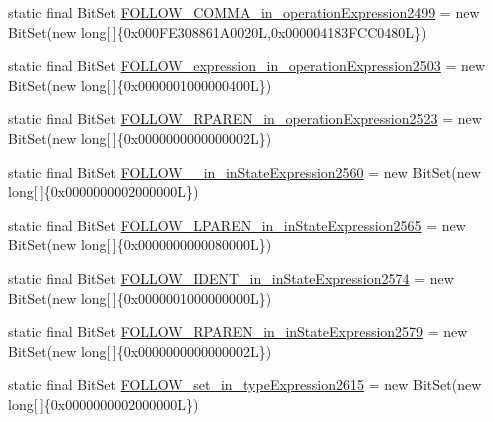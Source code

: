 \begin{DoxyCompactItemize}
\item 
static final Bit\-Set \hyperlink{classorg_1_1tzi_1_1use_1_1parser_1_1testsuite_1_1_test_suite_parser_ab42bb76aa04375a734dec8900dbc49cb}{F\-O\-L\-L\-O\-W\-\_\-\-C\-O\-M\-M\-A\-\_\-in\-\_\-operation\-Expression2499} = new Bit\-Set(new long\mbox{[}$\,$\mbox{]}\{0x000\-F\-E308861\-A0020\-L,0x000004183\-F\-C\-C0480\-L\})
\item 
static final Bit\-Set \hyperlink{classorg_1_1tzi_1_1use_1_1parser_1_1testsuite_1_1_test_suite_parser_afc4b5501b39f263dea08de52afee6666}{F\-O\-L\-L\-O\-W\-\_\-expression\-\_\-in\-\_\-operation\-Expression2503} = new Bit\-Set(new long\mbox{[}$\,$\mbox{]}\{0x0000001000000400\-L\})
\item 
static final Bit\-Set \hyperlink{classorg_1_1tzi_1_1use_1_1parser_1_1testsuite_1_1_test_suite_parser_a02188ad2dc02b89879d511aaf051042a}{F\-O\-L\-L\-O\-W\-\_\-\-R\-P\-A\-R\-E\-N\-\_\-in\-\_\-operation\-Expression2523} = new Bit\-Set(new long\mbox{[}$\,$\mbox{]}\{0x0000000000000002\-L\})
\item 
static final Bit\-Set \hyperlink{classorg_1_1tzi_1_1use_1_1parser_1_1testsuite_1_1_test_suite_parser_af2511912f1e7b2a84699bab530325849}{F\-O\-L\-L\-O\-W\-\_\-\_\-in\-\_\-in\-State\-Expression2560} = new Bit\-Set(new long\mbox{[}$\,$\mbox{]}\{0x0000000002000000\-L\})
\item 
static final Bit\-Set \hyperlink{classorg_1_1tzi_1_1use_1_1parser_1_1testsuite_1_1_test_suite_parser_aa189f838cd7de58e0e047d29d112c6b3}{F\-O\-L\-L\-O\-W\-\_\-\-L\-P\-A\-R\-E\-N\-\_\-in\-\_\-in\-State\-Expression2565} = new Bit\-Set(new long\mbox{[}$\,$\mbox{]}\{0x0000000000080000\-L\})
\item 
static final Bit\-Set \hyperlink{classorg_1_1tzi_1_1use_1_1parser_1_1testsuite_1_1_test_suite_parser_a26b1eb2a3c7a8e7a701cfa111020f2f4}{F\-O\-L\-L\-O\-W\-\_\-\-I\-D\-E\-N\-T\-\_\-in\-\_\-in\-State\-Expression2574} = new Bit\-Set(new long\mbox{[}$\,$\mbox{]}\{0x0000001000000000\-L\})
\item 
static final Bit\-Set \hyperlink{classorg_1_1tzi_1_1use_1_1parser_1_1testsuite_1_1_test_suite_parser_a15c6b09294ab607852ae97b8eb0a009d}{F\-O\-L\-L\-O\-W\-\_\-\-R\-P\-A\-R\-E\-N\-\_\-in\-\_\-in\-State\-Expression2579} = new Bit\-Set(new long\mbox{[}$\,$\mbox{]}\{0x0000000000000002\-L\})
\item 
static final Bit\-Set \hyperlink{classorg_1_1tzi_1_1use_1_1parser_1_1testsuite_1_1_test_suite_parser_a4c8daa623edaa8dc4c4af7df1cb61046}{F\-O\-L\-L\-O\-W\-\_\-set\-\_\-in\-\_\-type\-Expression2615} = new Bit\-Set(new long\mbox{[}$\,$\mbox{]}\{0x0000000002000000\-L\})

\end{DoxyCompactItemize}
